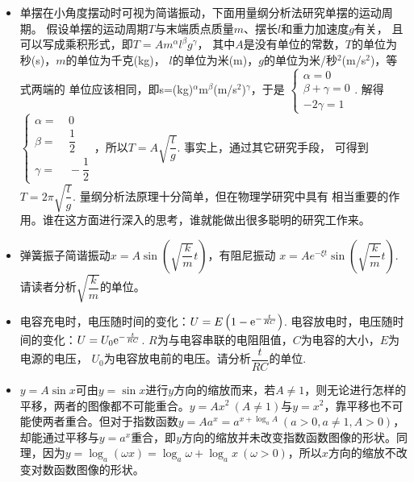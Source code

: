 \begin{itemize}[leftmargin=\inteval{\myitemleftmargin}pt,itemsep=
   \inteval{\myitemitempsep}pt,topsep=\inteval{\myitemtopsep}pt]
\item 单摆在小角度摆动时可视为简谐振动，下面用量纲分析法研究单摆的运动周期。
假设单摆的运动周期$ T $与末端质点质量$ m $、摆长$ l $和重力加速度$ g $有关，
且可以写成乘积形式，即$ T=Am^{\alpha}l^{\beta}g^{\gamma} $，
其中$ A $是没有单位的常数，$ T $的单位为秒(s)，$ m $的单位为千克(kg)，
$ l $的单位为米(m)，$ g $的单位为米/秒$ ^2 $(m/s$ ^2 $)，等式两端的
单位应该相同，即s=(kg)$ ^\alpha $m$ ^\beta $(m/s$ ^2 $)$ ^\gamma $，于是
$ \left\{ 
\begin{aligned}
    \alpha=0 \\
    \beta+\gamma =0 \\
    -2\gamma =1
\end{aligned} \right. $. 解得
$ \left\{ 
\begin{aligned}
    \alpha=&\ 0 \\
    \beta=&\ \dfrac{1}{2} \\
    \gamma =&\ -\dfrac{1}{2}
\end{aligned} \right. $，所以$ T=A\sqrt{\dfrac{l}{g}} $. 事实上，通过其它研究手段，
可得到$ T=2\pi \sqrt{\dfrac{l}{g}} $. 量纲分析法原理十分简单，但在物理学研究中具有
相当重要的作用。谁在这方面进行深入的思考，谁就能做出很多聪明的研究工作来。

\item 弹簧振子简谐振动$ x=A\sin\left( \sqrt{\dfrac{k}{m}}t\right) $，有阻尼振动
$ x=Ae^{-\xi t}\sin\left( \sqrt{\dfrac{k}{m}}t\right) $. 
请读者分析$ \sqrt{\dfrac{k}{m}} $的单位。

\item 电容充电时，电压随时间的变化：$ U=E\left(1-\mathrm{e}^{-\frac{t}{RC}} \right) $. 
电容放电时，电压随时间的变化：$ U=U_0\mathrm{e}^{-\frac{t}{RC}}$.
$ R $为与电容串联的电阻阻值，$ C $为电容的大小，$ E $为电源的电压，
$ U_0 $为电容放电前的电压。请分析$ \dfrac{t}{RC} $的单位.

\item $ y=A\sin x $可由$ y=\sin x $进行$ y $方向的缩放而来，若$ A\neq 1 $，则无论进行怎样的平移，两者的图像都不可能重合。$ y=Ax^2\ (A\neq 1) $与$ y=x^2 $，靠平移也不可能使两者重合。但对于指数函数$ y=Aa^x=a^{x+\log_a A}\ (a>0,a\neq 1,A>0) $，却能通过平移与$ y=a^x $重合，即$ y $方向的缩放并未改变指数函数图像的形状。同理，因为$ y=\log_a(\omega x)=\log_a \omega+\log_a x \ (\omega>0) $，所以$ x $方向的缩放不改变对数函数图像的形状。


\end{itemize}
